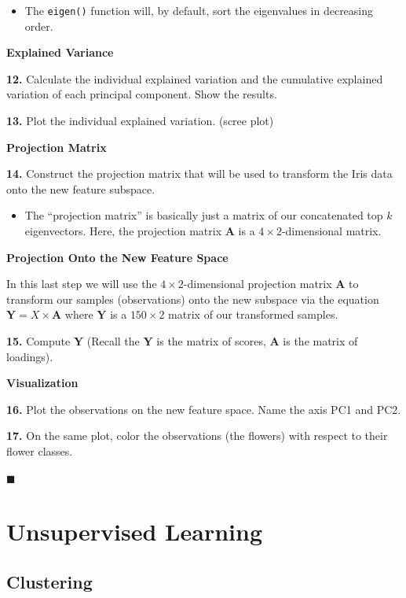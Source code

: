 \documentclass[]{book}
\newenvironment{rmdblock}[1]
  {\begin{shaded*}
  \begin{itemize}
  \renewcommand{\labelitemi}{
    \raisebox{-.7\height}[0pt][0pt]{
      {\setkeys{Gin}{width=2em,keepaspectratio}\texttt{[image: img/icons/\#1]}}
    }
  }
  \item
  }
  {
  \end{itemize}
  \end{shaded*}
  }
\newenvironment{rmdinsight}
  {\begin{rmdblock}{insight}}
  {\end{rmdblock}}
\newenvironment{rmdtip}
  {\begin{rmdblock}{tip}}
  {\end{rmdblock}}
\theoremstyle{definition}
\theoremstyle{definition}
\theoremstyle{definition}
\theoremstyle{remark}
\begin{document}
\begin{rmdinsight}
The \texttt{eigen()} function will, by default, sort the eigenvalues in
decreasing order.
\end{rmdinsight}

\textbf{Explained Variance}

\textbf{12.} Calculate the individual explained variation and the
cumulative explained variation of each principal component. Show the
results.

\textbf{13.} Plot the individual explained variation. (scree plot)

\textbf{Projection Matrix}

\textbf{14.} Construct the projection matrix that will be used to
transform the Iris data onto the new feature subspace.

\begin{rmdtip}
The ``projection matrix'' is basically just a matrix of our concatenated
top \(k\) eigenvectors. Here, the projection matrix \(\mathbf{A}\) is a
\(4 \times 2\)-dimensional matrix.
\end{rmdtip}

\textbf{Projection Onto the New Feature Space}

In this last step we will use the \(4 \times 2\)-dimensional projection
matrix \(\mathbf{A}\) to transform our samples (observations) onto the
new subspace via the equation \(\mathbf{Y}=X \times \mathbf{A}\) where
\(\mathbf{Y}\) is a \(150 \times 2\) matrix of our transformed samples.

\textbf{15.} Compute \(\mathbf{Y}\) (Recall the \(\mathbf{Y}\) is the
matrix of scores, \(\mathbf{A}\) is the matrix of loadings).

\textbf{Visualization}

\textbf{16.} Plot the observations on the new feature space. Name the
axis PC1 and PC2.

\textbf{17.} On the same plot, color the observations (the flowers) with
respect to their flower classes.

◼

\part{Unsupervised
Learning}\label{part-unsupervised-learning}

\chapter{Clustering}\label{clustering}
\end{document}
